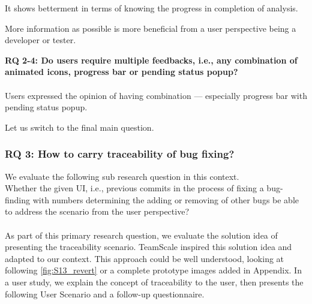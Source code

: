 \begin{myboxi}
	It shows betterment in terms of knowing the progress in completion of analysis.
\end{myboxi}

\begin{myboxi}
	More information as possible is more beneficial from a user perspective being a developer or tester.
\end{myboxi}

\begin{myboxi}{ \textbf{RQ 2-4: Do users require multiple feedbacks, i.e., any combination of animated icons, progress bar or pending status popup?}} 
\\ \\	Users expressed the opinion of having combination — especially progress bar with pending status popup.
\end{myboxi} 
\hfill \break
Let us switch to the final main question. \\

\subsubsection{RQ 3: How to carry traceability of bug fixing?}

We evaluate the following sub research question in this context. \\

Whether the given UI, i.e., previous commits in the process of fixing a bug-finding with numbers determining the adding or removing of other bugs be able to address the scenario from the user perspective? \\ \\

As part of this primary research question, we evaluate the solution idea of presenting the traceability scenario. TeamScale inspired this solution idea and adapted to our context. This approach could be well understood, looking at following \autoref{fig:S13_revert} or a complete prototype images added in Appendix. In a user study, we explain the concept of traceability to the user, then presents the following User Scenario and a follow-up questionnaire. \\ \\




